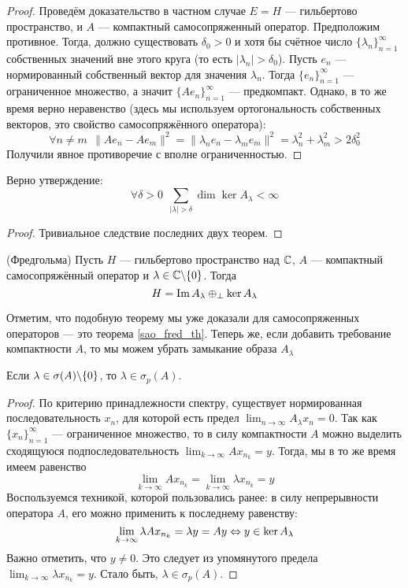 \begin{proof}
	Проведём доказательство в частном случае $E = H$ --- гильбертово пространство, и $A$ --- компактный самосопряженный оператор. Предположим противное. Тогда, должно существовать $\delta_0 > 0$ и хотя бы счётное число $\{\lambda_n\}_{n = 1}^\infty$ собственных значений вне этого круга (то есть $|\lambda_n| > \delta_0$). Пусть $e_n$ --- нормированный собственный вектор для значения $\lambda_n$. Тогда $\{e_n\}_{n = 1}^\infty$ --- ограниченное множество, а значит $\{Ae_n\}_{n = 1}^\infty$ --- предкомпакт. Однако, в то же время верно неравенство (здесь мы используем ортогональность собственных векторов, это свойство самосопряжённого оператора):
	\[
		\forall n \neq m\ \ \|Ae_n - Ae_m\|^2 = \|\lambda_n e_n - \lambda_m e_m\|^2 = \lambda_n^2 + \lambda_m^2 > 2\delta_0^2
	\]
	Получили явное противоречие с вполне ограниченностью.
\end{proof}

\begin{corollary}
	Верно утверждение:
	\[
		\forall \delta > 0\ \ \sum_{|\lambda| > \delta} \dim \ker A_\lambda < \infty
	\]
\end{corollary}

\begin{proof}
	Тривиальное следствие последних двух теорем.
\end{proof}

\begin{theorem} (Фредгольма)
	Пусть $H$ --- гильбертово пространство над $\mathbb{C}$, $A$ --- компактный самосопряжённый оператор и $\lambda \in \mathbb{C} \backslash \{0\}$. Тогда
	\[
		H = \operatorname{Im} A_\lambda \oplus_{\bot} \ker A_\lambda
	\]
\end{theorem}

\begin{note}
	Отметим, что подобную теорему мы уже доказали для самосопряженных операторов --- это теорема \ref{sao_fred_th}. Теперь же, если добавить требование компактности $A$, то мы можем убрать замыкание образа $A_\lambda$
\end{note}

\begin{lemma} \label{simple_spectre}
	Если $\lambda \in \sigma(A) \backslash \{0\}$, то $\lambda \in \sigma_p(A)$.
\end{lemma}

\begin{proof}
	По критерию принадлежности спектру, существует нормированная последовательность $x_n$, для которой есть предел $\lim_{n \to \infty} A_\lambda x_n = 0$. Так как $\{x_n\}_{n = 1}^\infty$ --- ограниченное множество, то в силу компактности $A$ можно выделить сходящуюся подпоследовательность $\lim_{k \to \infty} Ax_{n_k} = y$. Тогда, мы в то же время имеем равенство
	\[
		\lim_{k \to \infty} Ax_{n_k} = \lim_{k \to \infty} \lambda x_{n_k} = y
	\]
	Воспользуемся техникой, которой пользовались ранее: в силу непрерывности оператора $A$, его можно применить к последнему равенству:
	\[
		\lim_{k \to \infty} \lambda Ax_{n_k} = \lambda y = Ay \Leftrightarrow y \in \ker A_\lambda
	\]
	Важно отметить, что $y \neq 0$. Это следует из упомянутого предела $\lim_{k \to \infty} \lambda x_{n_k} = y$. Стало быть, $\lambda \in \sigma_p(A)$.
\end{proof}

